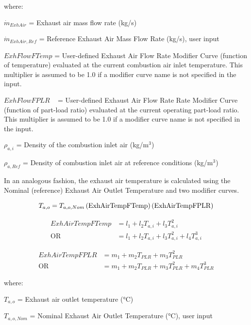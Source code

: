 where:

\({\dot m_{ExhAir}}\) = Exhaust air mass flow rate (kg/s)

\({\dot m_{ExhAir,Ref}}\) = Reference Exhaust Air Mass Flow Rate (kg/s), user input

\(ExhFlowFTemp\) = User-defined Exhaust Air Flow Rate Modifier Curve (function of temperature) evaluated at the current combustion air inlet temperature. This multiplier is assumed to be 1.0 if a modifier curve name is not specified in the input.

\(ExhFlowFPLR\) ~ = User-defined Exhaust Air Flow Rate Rate Modifier Curve (function of part-load ratio) evaluated at the current operating part-load ratio. This multiplier is assumed to be 1.0 if a modifier curve name is not specified in the input.

\({\rho_{a,i}}\) = Density of the combustion inlet air (kg/m\(^{3}\))

\({\rho_{a,Ref}}\) = Density of combustion inlet air at reference conditions (kg/m\(^{3}\))

In an analogous fashion, the exhaust air temperature is calculated using the Nominal (reference) Exhaust Air Outlet Temperature and two modifier curves.

\begin{equation}
  T_{a,o} = T_{a,o,Nom} \left(\text{ExhAirTempFTemp}\right) \left(\text{ExhAirTempFPLR}\right)
\end{equation}

\begin{equation}
  \begin{array}{cc}
    ExhAirTempFTemp  &= l_1 + l_2 T_{a,i} + l_3 T_{a,i}^2 \\
           \text{OR} &= l_1 + l_2 T_{a,i} + l_3 T_{a,i}^2 + l_4 T_{a,i}^3
  \end{array}
\end{equation}

\begin{equation}
  \begin{array}{cc}
    ExhAirTempFPLR   &= m_1 + m_2 T_{PLR} + m_3 T_{PLR}^2 \\
           \text{OR} &= m_1 + m_2 T_{PLR} + m_3 T_{PLR}^2 + m_4 T_{PLR}^3
  \end{array}
\end{equation}

where:

\({T_{a,o}}\) = Exhaust air outlet temperature (°C)

\({T_{a,o,Nom}}\) = Nominal Exhaust Air Outlet Temperature (°C), user input

